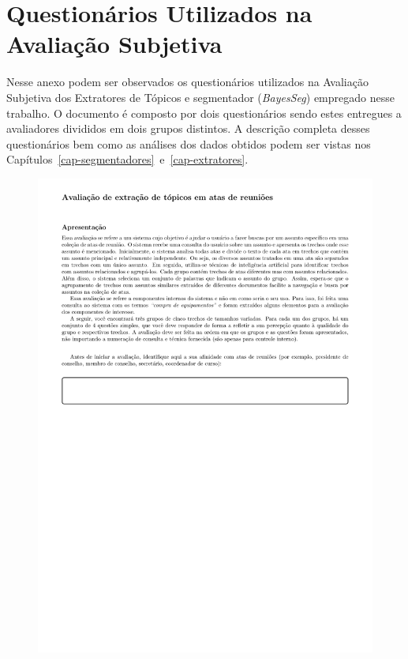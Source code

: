 \chapter{ Questionários Utilizados na Avaliação Subjetiva}\label{apendice2}





Nesse anexo podem ser observados os questionários utilizados na Avaliação Subjetiva dos Extratores de Tópicos e segmentador (\textit{BayesSeg}) empregado nesse trabalho. 
O documento é composto por dois questionários sendo estes entregues a avaliadores divididos em dois grupos distintos.
A descrição completa desses questionários bem como as análises dos dados obtidos podem ser vistas nos Capítulos~\ref{cap-segmentadores}~e~\ref{cap-extratores}.


\begin{figure}[h!]
\center
	\includegraphics[trim={ 40 0 0 0 }, trim={ 0 60 0 66 }, page=1,width=1.1\textwidth]{anexos/avaliacao-sistema/avaliacao-sistema.pdf}
\end{figure}


